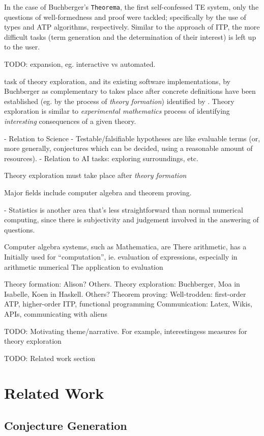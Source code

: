 \documentclass[]{article}
\begin{document}
In the case of Buchberger's \texttt{Theorema}, the first self-confessed TE system, only the questions of well-formedness and proof were tackled; specifically by the use of types and ATP algorithms, respectively. Similar to the approach of ITP, the more difficult tasks (term generation and the determination of their interest) is left up to the user.

TODO: expansion, eg. interactive vs automated.


  task of theory exploration, and its existing software implementations, by Buchberger as complementary to  takes place after concrete definitions have been established (eg. by the process of \emph{theory formation})  identified by . Theory exploration is similar to \emph{experimental mathematics} process of identifying \emph{interesting} consequences of a given theory.

 - Relation to Science
  - Testable/falsifiable hypotheses are like evaluable terms (or, more generally, conjectures which can be decided, using a reasonable amount of resources).
 - Relation to AI tasks: exploring surroundings, etc.

Theory exploration must take place after \emph{theory formation}

Major fields include computer algebra and theorem proving.

- Statistics is another area that's less straightforward than normal numerical computing, since there is subjectivity and judgement involved in the answering of questions.

Computer algebra systems, such as Mathematica, are
There arithmetic, has a Initially used for ``computation'', ie. evaluation of expressions,
especially in arithmetic numerical The application to evaluation

Theory formation: Alison? Others.
Theory exploration: Buchberger, Moa in Isabelle, Koen in Haskell. Others?
Theorem proving: Well-trodden: first-order ATP, higher-order ITP, functional programming
Communication: Latex, Wikis, APIs, communicating with aliens

TODO: Motivating theme/narrative. For example, interestingess measures for theory exploration

TODO: Related work section
\section{Related Work}
\label{related}

\subsection{Conjecture Generation}
\end{document}
